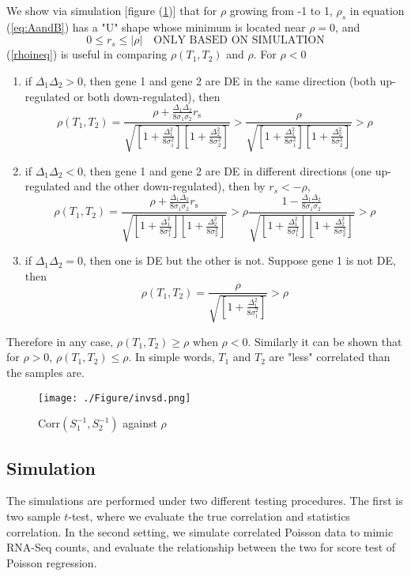 \documentclass[12pt, a4paper]{article}
\newcommand{\cor}{\text{Corr}}
\begin{document}
	We show via simulation [figure (\ref{invsd})] that for $\rho$ growing from -1 to 1, $\rho_s$
	in equation (\ref{eq:AandB}) has a "U" shape whose minimum is located near $\rho=0$, and  
	\begin{equation}\label{rhoineq}
		0 \leq r_s \leq |\rho| \text{~~ ONLY BASED ON SIMULATION}
	\end{equation}
	(\ref{rhoineq}) is useful in comparing  $\rho({T_1, T_2})$  and $\rho$. 
	For $\rho <0 $
	\begin{enumerate}
		\item if $\Delta_1\Delta_2 >0$, then gene 1 and gene 2 are DE in the same direction (both 
		up-regulated or both down-regulated), then 
		\[\rho(T_1, T_2)= \frac{\rho + \frac{\Delta_1\Delta_2}{8\sigma_1\sigma_2}r_{\text{s}}}{\sqrt{ 
				\left[ 1 + \frac{\Delta_1^2}{8\sigma_1^2}\right]\left[ 1 + \frac{\Delta_2^2}{8\sigma_2^2}\right]}} 
		>\frac{\rho }{\sqrt{  \left[ 1 + \frac{\Delta_1^2}{8\sigma_1^2}\right]\left[ 1 +
				\frac{\Delta_2^2}{8\sigma_2^2}\right]}} >\rho\]
		\item  if $\Delta_1\Delta_2 <0$, then gene 1 and gene 2 are DE in different directions (one
		up-regulated and the other down-regulated), then by $r_s < -\rho$, 
		\[\rho(T_1, T_2)= \frac{\rho + \frac{\Delta_1\Delta_2}{8\sigma_1\sigma_2}r_{\text{s}}}{\sqrt{ 
				\left[ 1 + \frac{\Delta_1^2}{8\sigma_1^2}\right]\left[ 1 + \frac{\Delta_2^2}{8\sigma_2^2}\right]}} 
		>\rho\frac{ 1-\frac{\Delta_1\Delta_2}{8\sigma_1\sigma_2}}{\sqrt{  \left[ 1 +
				\frac{\Delta_1^2}{8\sigma_1^2}\right]\left[ 1 + \frac{\Delta_2^2}{8\sigma_2^2}\right]}} >\rho\]
		\item if  $\Delta_1\Delta_2 =0$, then one is DE but the other is not. Suppose gene 1 is not DE,
		then
		\[\rho(T_1, T_2)= \frac{\rho}{\sqrt{  \left[ 1 + \frac{\Delta_1^2}{8\sigma_1^2}\right]}} >\rho \]
		
	\end{enumerate}
	Therefore in any case, $\rho(T_1, T_2) \geq \rho$ when $\rho <0$. Similarly it can be shown that for
	$\rho >0$, $\rho(T_1, T_2) \leq \rho $. In simple words,  $T_1$ and $T_2$ are "less" correlated than
	the samples are. 
	\begin{figure}[!h]
		\centering
		\caption{$\cor(S^{-1}_1, S^{-1}_2)$ against $\rho$}
		\texttt{[image: ./Figure/invsd.png]}
		\label{invsd}
	\end{figure}
	
	
	
	\subsection{Simulation}
	The simulations are performed under two different testing procedures. The first is two sample
	$t$-test, where we evaluate the true correlation and statistics correlation.  In the second setting,
	we simulate correlated Poisson data to mimic RNA-Seq counts, and evaluate the relationship between
	the two for score test of Poisson regression. \\
	
\end{document}
